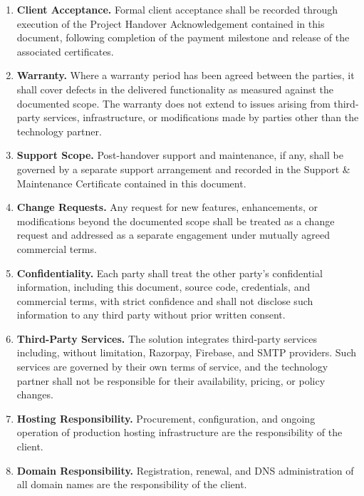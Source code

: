 \documentclass[11pt,a4paper]{article}
\begin{document}
\begin{enumerate}[leftmargin=*, itemsep=8pt]
    \item \textbf{Client Acceptance.} Formal client acceptance shall be
    recorded through execution of the Project Handover Acknowledgement
    contained in this document, following completion of the payment milestone
    and release of the associated certificates.

    \item \textbf{Warranty.} Where a warranty period has been agreed between
    the parties, it shall cover defects in the delivered functionality as
    measured against the documented scope. The warranty does not extend to
    issues arising from third-party services, infrastructure, or
    modifications made by parties other than the technology partner.

    \item \textbf{Support Scope.} Post-handover support and maintenance, if
    any, shall be governed by a separate support arrangement and recorded in
    the Support \& Maintenance Certificate contained in this document.

    \item \textbf{Change Requests.} Any request for new features,
    enhancements, or modifications beyond the documented scope shall be
    treated as a change request and addressed as a separate engagement under
    mutually agreed commercial terms.

    \item \textbf{Confidentiality.} Each party shall treat the other party's
    confidential information, including this document, source code,
    credentials, and commercial terms, with strict confidence and shall not
    disclose such information to any third party without prior written
    consent.

    \item \textbf{Third-Party Services.} The solution integrates third-party
    services including, without limitation, Razorpay, Firebase, and SMTP
    providers. Such services are governed by their own terms of service, and
    the technology partner shall not be responsible for their availability,
    pricing, or policy changes.

    \item \textbf{Hosting Responsibility.} Procurement, configuration, and
    ongoing operation of production hosting infrastructure are the
    responsibility of the client.

    \item \textbf{Domain Responsibility.} Registration, renewal, and DNS
    administration of all domain names are the responsibility of the client.


\end{enumerate}
\end{document}

